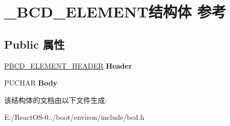 \hypertarget{struct___b_c_d___e_l_e_m_e_n_t}{}\section{\+\_\+\+B\+C\+D\+\_\+\+E\+L\+E\+M\+E\+N\+T结构体 参考}
\label{struct___b_c_d___e_l_e_m_e_n_t}
\subsection*{Public 属性}
\begin{DoxyCompactItemize}
\item 
\mbox{\label{struct___b_c_d___e_l_e_m_e_n_t_a97900502c34910ea68ae40068a2c66f4}} 
\hyperlink{struct___b_c_d___e_l_e_m_e_n_t___h_e_a_d_e_r}{P\+B\+C\+D\+\_\+\+E\+L\+E\+M\+E\+N\+T\+\_\+\+H\+E\+A\+D\+ER} {\bfseries Header}
\item 
\mbox{\label{struct___b_c_d___e_l_e_m_e_n_t_a85a3de0174e317e64e150f49940a1a32}} 
P\+U\+C\+H\+AR {\bfseries Body}
\end{DoxyCompactItemize}


该结构体的文档由以下文件生成\+:\begin{DoxyCompactItemize}
\item 
E\+:/\+React\+O\+S-\/0../boot/environ/include/bcd.\+h\end{DoxyCompactItemize}
